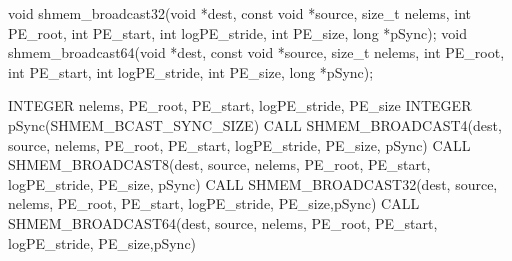 
\begin{apidefinition}

\begin{Csynopsis}
void shmem_broadcast32(void *dest, const void *source, size_t nelems, int PE_root, int PE_start, int logPE_stride, int PE_size, long *pSync);
void shmem_broadcast64(void *dest, const void *source, size_t nelems, int PE_root, int PE_start, int logPE_stride, int PE_size, long *pSync);
\end{Csynopsis}

\begin{DeprecateBlock}
\begin{Fsynopsis}
INTEGER nelems, PE_root, PE_start, logPE_stride, PE_size
INTEGER pSync(SHMEM_BCAST_SYNC_SIZE)
CALL SHMEM_BROADCAST4(dest, source, nelems, PE_root, PE_start, logPE_stride, PE_size, pSync)
CALL SHMEM_BROADCAST8(dest, source, nelems, PE_root, PE_start, logPE_stride, PE_size, pSync)
CALL SHMEM_BROADCAST32(dest, source, nelems, PE_root, PE_start, logPE_stride, PE_size,pSync)
CALL SHMEM_BROADCAST64(dest, source, nelems, PE_root, PE_start, logPE_stride, PE_size,pSync)
\end{Fsynopsis}
\end{DeprecateBlock}
 
\begin{apiarguments}


\end{apiarguments}
\end{apidefinition}
